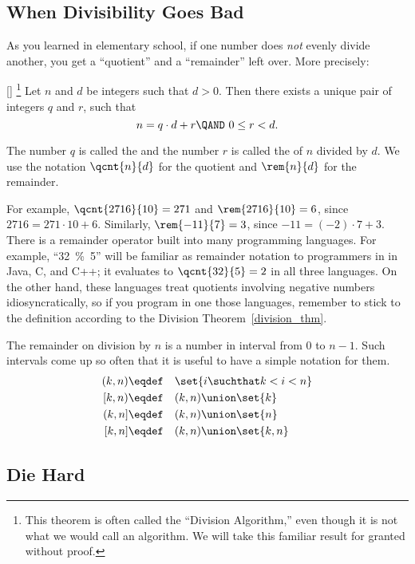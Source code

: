 \subsection{When Divisibility Goes Bad}

As you learned in elementary school, if one number does \emph{not}
evenly divide another, you get a ``quotient'' and a ``remainder'' left
over.  More precisely:
\begin{theorem}\label{division_thm}[]%
\footnote{This theorem is often called the ``Division Algorithm,'' even
though it is not what we would call an algorithm.  We will take this
familiar result for granted without proof.}  Let $n$ and $d$ be
integers such that $d > 0$.  Then there exists a unique pair of
integers $q$ and $r$, such that
\begin{equation}\label{nqdr}
n = q \cdot d + r \QAND\ 0  \leq r < d.
\end{equation}
\end{theorem}
The number $q$ is called the  and the number $r$ is
called the  of $n$ divided by $d$.  We use the
notation $\qcnt{n}{d}$ for the quotient and $\rem{n}{d}$ for the
remainder.

For example, $\qcnt{2716}{10} = 271$ and $\rem{2716}{10} = 6$, since
$2716 = 271 \cdot 10 + 6$.  Similarly, $\rem{-11}{7} = 3$, since $-11
= (-2) \cdot 7 + 3$.  There is a remainder operator built into many
programming languages.  For example, ``32~\%~5'' will be familiar as
remainder notation to programmers in in Java, C, and C++; it evaluates
to $\qcnt{32}{5} =2$ in all three languages.  On the other hand, these
languages treat quotients involving negative numbers
idiosyncratically, so if you program in one those languages, remember
to stick to the definition according to the Division
Theorem~\ref{division_thm}.

The remainder on division by $n$ is a number in interval from 0 to
$n-1$.  Such intervals come up so often that it is useful to have a
simple notation for them.
\begin{align*}
(k, n) & \eqdef\quad \set{i \suchthat k < i < n}\\
[k, n) & \eqdef\quad (k,n) \union \set{k}\\
(k, n] & \eqdef\quad (k,n) \union \set{n}\\
[k,n]  & \eqdef\quad (k,n) \union \set{k,n}
\end{align*}

\subsection{Die Hard}

